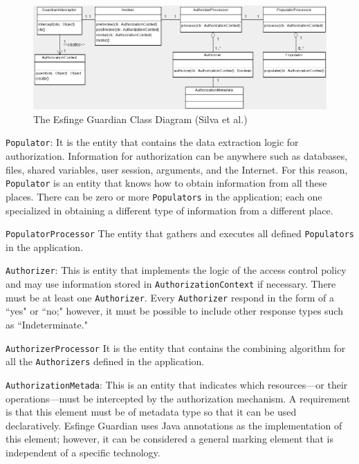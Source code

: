 \documentclass[sigconf]{acmart}
\begin{document}
\begin{figure}
 \centering
 \includegraphics[scale=0.4]{img/guardian-class-diagram.png}
 \caption{The Esfinge Guardian Class Diagram (Silva et al.\cite{Silva2013})}
 \label{fig:class-diagram}
\end{figure}

\vspace{0.8mm} \noindent \verb|Populator|:
It is the entity that contains the data extraction logic for authorization. Information for authorization can be anywhere such as databases, files, shared variables, user session, arguments, and the Internet. For this reason, \verb|Populator| is an entity that knows how to obtain information from all these places.
There can be zero or more \verb|Populators| in the application; each one specialized in obtaining a different type of information from a different place.

\vspace{0.8mm} \noindent \verb|PopulatorProcessor|
The entity that gathers and executes all defined \verb|Populators| in the application.

\vspace{0.8mm} \noindent \verb|Authorizer|: This is entity that implements the logic of the access control policy and may use information stored in \verb|AuthorizationContext| if necessary. There must be at least one \verb|Authorizer|. Every \verb|Authorizer| respond in the form of a ``yes" or ``no;" however, it must be possible to include other response types such as ``Indeterminate."

\vspace{0.8mm} \noindent \verb|AuthorizerProcessor|
It is the entity that contains the combining algorithm for all the \verb|Authorizers| defined in the application.

\vspace{0.8mm} \noindent \verb|AuthorizationMetada|:
This is an entity that indicates which resources---or their operations---must be intercepted by the authorization mechanism. A requirement is that this element must be of metadata type so that it can be used declaratively. Esfinge Guardian uses Java annotations as the implementation of this element; however, it can be considered a general marking element that is independent of a specific technology.
\end{document}
